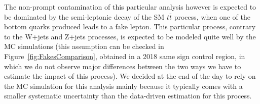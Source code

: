 \documentclass[a4paper, 10pt, openright]{report}
\begin{document}

The non-prompt contamination of this particular analysis however is expected to be dominated by the semi-leptonic decay of the \ac{SM} $t \bar t$ process, when one of the bottom quarks produced leads to a fake lepton. This particular process, contrary to the W+jets and Z+jets processes, is expected to be modeled quite well by the \ac{MC} simulations (this assumption can be checked in Figure~\ref{fig:FakesComparison}, obtained in a 2018 same sign control region, in which we do not observe major differences between the two ways we have to estimate the impact of this process). We decided at the end of the day to rely on the \ac{MC} simulation for this analysis mainly because it typically comes with a smaller systematic uncertainty than the data-driven estimation for this process. %
\end{document}
